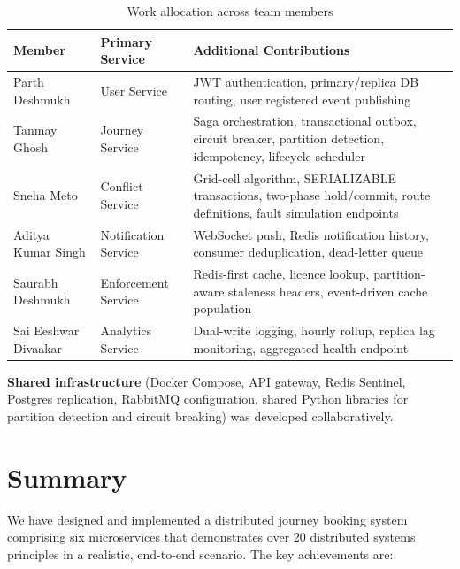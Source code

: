 \documentclass[12pt,a4paper]{article}
\begin{document}
\begin{table}[H]
\centering
\caption{Work allocation across team members}
\begin{tabularx}{\textwidth}{l l X}
  \toprule
  \textbf{Member} & \textbf{Primary Service} & \textbf{Additional Contributions} \\
  \midrule
  Parth Deshmukh & User Service & JWT authentication, primary/replica DB routing, user.registered event publishing \\
  \addlinespace
  Tanmay Ghosh & Journey Service & Saga orchestration, transactional outbox, circuit breaker, partition detection, idempotency, lifecycle scheduler \\
  \addlinespace
  Sneha Meto & Conflict Service & Grid-cell algorithm, SERIALIZABLE transactions, two-phase hold/commit, route definitions, fault simulation endpoints \\
  \addlinespace
  Aditya Kumar Singh & Notification Service & WebSocket push, Redis notification history, consumer deduplication, dead-letter queue \\
  \addlinespace
  Saurabh Deshmukh & Enforcement Service & Redis-first cache, licence lookup, partition-aware staleness headers, event-driven cache population \\
  \addlinespace
  Sai Eeshwar Divaakar & Analytics Service & Dual-write logging, hourly rollup, replica lag monitoring, aggregated health endpoint \\
  \bottomrule
\end{tabularx}
\end{table}

\textbf{Shared infrastructure} (Docker Compose, API gateway, Redis Sentinel, Postgres replication, RabbitMQ configuration, shared Python libraries for partition detection and circuit breaking) was developed collaboratively.

\section{Summary}

We have designed and implemented a distributed journey booking system comprising six microservices that demonstrates over 20 distributed systems principles in a realistic, end-to-end scenario. The key achievements are:
\end{document}
